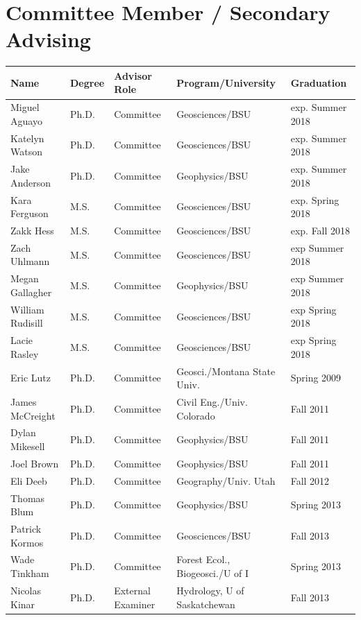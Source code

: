 \documentclass[11pt]{article}
\renewcommand\arraystretch{1}
\begin{document}
\section*{Committee Member / Secondary Advising}
\begin{table}[!htbp]
\renewcommand\arraystretch{0.7}
  \centering
  \begin{tabular}{|l|l|l|l|l|}
\hline
\textbf{Name} & \textbf{Degree} & \textbf{Advisor Role} & \textbf{Program/University} & \textbf{Graduation} \\ \hline \hline
Miguel Aguayo & Ph.D. & Committee & Geosciences/BSU & exp. Summer 2018 \\ \hline
Katelyn Watson & Ph.D. & Committee & Geosciences/BSU & exp. Summer 2018 \\ \hline
Jake Anderson & Ph.D. & Committee & Geophysics/BSU & exp. Summer 2018 \\ \hline
Kara Ferguson & M.S. & Committee & Geosciences/BSU & exp. Spring 2018 \\ \hline
Zakk Hess & M.S. & Committee & Geosciences/BSU & exp. Fall 2018 \\ \hline
Zach Uhlmann & M.S. & Committee & Geosciences/BSU & exp Summer 2018 \\ \hline
Megan Gallagher & M.S. & Committee & Geophysics/BSU & exp Summer 2018 \\ \hline
William Rudisill & M.S. & Committee & Geosciences/BSU & exp Spring 2018 \\ \hline
Lacie Rasley & M.S. & Committee & Geosciences/BSU & exp Spring 2018 \\ \hline
Eric Lutz & Ph.D. & Committee & Geosci./Montana State Univ. & Spring 2009 \\ \hline
James McCreight & Ph.D. & Committee & Civil Eng./Univ. Colorado & Fall 2011 \\ \hline
Dylan Mikesell & Ph.D. & Committee & Geophysics/BSU & Fall 2011 \\ \hline
Joel Brown & Ph.D. & Committee & Geophysics/BSU & Fall 2011 \\ \hline
Eli Deeb & Ph.D. & Committee & Geography/Univ. Utah & Fall 2012 \\ \hline
Thomas Blum & Ph.D. & Committee & Geophysics/BSU & Spring 2013 \\ \hline
Patrick Kormos & Ph.D. & Committee & Geosciences/BSU & Fall 2013 \\ \hline
Wade Tinkham & Ph.D. & Committee & Forest Ecol., Biogeosci./U of I  & Spring 2013 \\ \hline
Nicolas Kinar & Ph.D. & External Examiner & Hydrology, U of Saskatchewan & Fall 2013 \\ \hline

\end{tabular}
\end{table}
\end{document}
